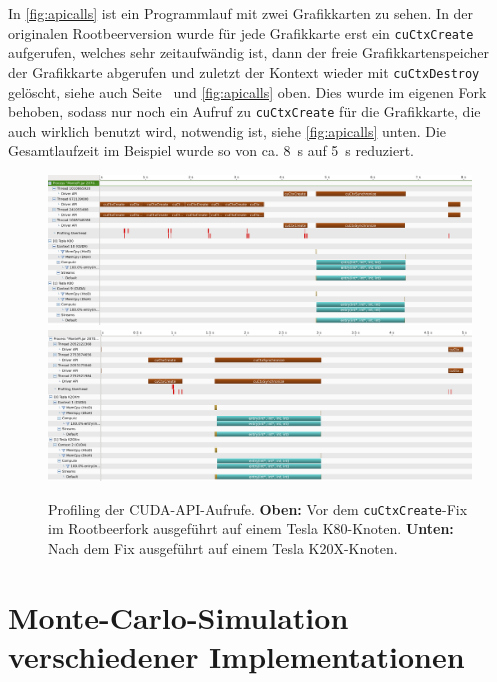 In \autoref{fig:apicalls} ist ein Programmlauf mit zwei Grafikkarten zu sehen.
In der originalen Rootbeerversion wurde für jede Grafikkarte erst ein \lstinline!cuCtxCreate! aufgerufen, welches sehr zeitaufwändig ist, dann der freie Grafikkartenspeicher der Grafikkarte abgerufen und zuletzt der Kontext wieder mit \lstinline!cuCtxDestroy! gelöscht, siehe auch Seite~\pageref{pg:cuCtxCreate} und \autoref{fig:apicalls} oben.
Dies wurde im eigenen Fork behoben, sodass nur noch ein Aufruf zu \lstinline!cuCtxCreate! für die Grafikkarte, die auch wirklich benutzt wird, notwendig ist, siehe \autoref{fig:apicalls} unten.
Die Gesamtlaufzeit im Beispiel wurde so von ca. \SI{8}{\second} auf \SI{5}{\second} reduziert.

\begin{figure}
	\begin{center}
		\includegraphics[width=\linewidth]{../MontePi/profiling/2of4-APICalls.png}\\
		\includegraphics[width=\linewidth]{../MontePi/profiling/2of2-afterLoadDevicesPerformanceFix.png}
	\end{center}
	\caption{Profiling der CUDA-API-Aufrufe. \textbf{Oben:} Vor dem \lstinline!cuCtxCreate!-Fix im Rootbeerfork ausgeführt auf einem Tesla K80-Knoten. \textbf{Unten:} Nach dem Fix ausgeführt auf einem Tesla K20X-Knoten.}
	\label{fig:apicalls}
\end{figure}


\section{Monte-Carlo-Simulation verschiedener Implementationen}

